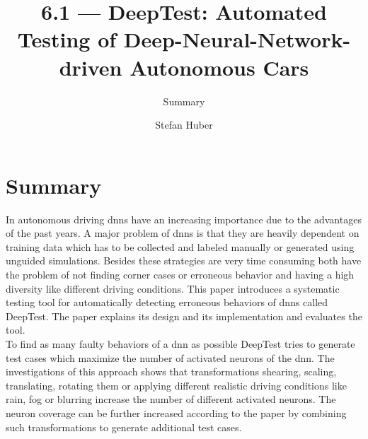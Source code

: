 \documentclass[oneside, notitlepage, twocolumn]{scrartcl}
\title{\LARGE 6.1 --- DeepTest: Automated Testing of Deep-Neural-Network-driven Autonomous Cars}
\subtitle{Summary}
\author{Stefan Huber}
\begin{document}
\maketitle

\section{Summary}
In autonomous driving \glspl{dnn} have an increasing importance due to the advantages of the past years.
A major problem of \glspl{dnn} is that they are heavily dependent on training data which has to be collected and labeled manually or generated using unguided simulations.
Besides these strategies are very time consuming both have the problem of not finding corner cases or erroneous behavior and having a high diversity like different driving conditions.
This paper introduces a systematic testing tool for automatically detecting erroneous behaviors of \glspl{dnn} called DeepTest.
The paper explains its design and its implementation and evaluates the tool.\\
To find as many faulty behaviors of a \gls{dnn} as possible DeepTest tries to generate test cases which maximize the number of activated neurons of the \gls{dnn}.
The investigations of this approach shows that transformations shearing, scaling, translating, rotating them or applying different realistic driving conditions like rain, fog or blurring increase the number of different activated neurons.
The neuron coverage can be further increased according to the paper by combining such transformations to generate additional test cases.
\end{document}
